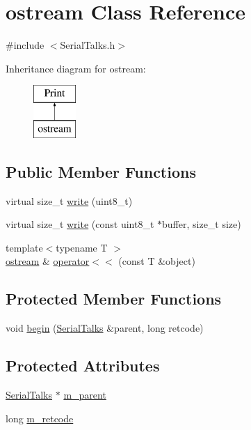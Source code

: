 \hypertarget{classostream}{}\section{ostream Class Reference}
\label{classostream}


{\ttfamily \#include $<$Serial\+Talks.\+h$>$}

Inheritance diagram for ostream\+:\begin{figure}[H]
\begin{center}
\leavevmode
\includegraphics[height=2.000000cm]{classostream}
\end{center}
\end{figure}
\subsection*{Public Member Functions}
\begin{DoxyCompactItemize}
\item 
virtual size\+\_\+t \hyperlink{classostream_a6f8b701c1cb3f122bf13074034520295}{write} (uint8\+\_\+t)
\item 
virtual size\+\_\+t \hyperlink{classostream_a3beab2da985550ca8ba66b4a77a410fb}{write} (const uint8\+\_\+t $\ast$buffer, size\+\_\+t size)
\item 
{\footnotesize template$<$typename T $>$ }\\\hyperlink{classostream}{ostream} \& \hyperlink{classostream_a9cb0d22f302c0f6617759ec2865f7704}{operator$<$$<$} (const T \&object)
\end{DoxyCompactItemize}
\subsection*{Protected Member Functions}
\begin{DoxyCompactItemize}
\item 
void \hyperlink{classostream_a55897fe17941a52bd6b192fc71282bc2}{begin} (\hyperlink{class_serial_talks}{Serial\+Talks} \&parent, long retcode)
\end{DoxyCompactItemize}
\subsection*{Protected Attributes}
\begin{DoxyCompactItemize}
\item 
\hyperlink{class_serial_talks}{Serial\+Talks} $\ast$ \hyperlink{classostream_ae7a12b9eca5c965ccaf44e09a63c4395}{m\+\_\+parent}
\item 
long \hyperlink{classostream_a00f9816ccfffe3c50d00726be18270a3}{m\+\_\+retcode}
\end{DoxyCompactItemize}
